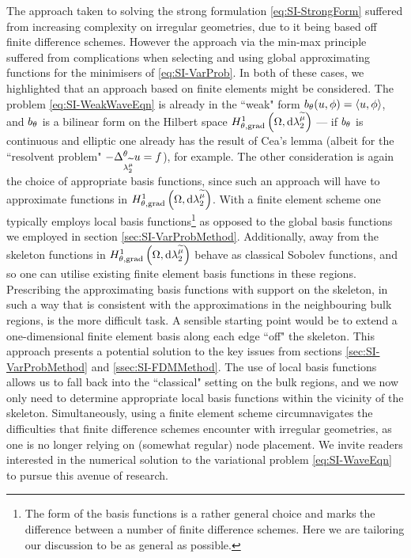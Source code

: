 The approach taken to solving the strong formulation \eqref{eq:SI-StrongForm} suffered from increasing complexity on irregular geometries, due to it being based off finite difference schemes.
However the approach via the min-max principle suffered from complications when selecting and using global approximating functions for the minimisers of \eqref{eq:SI-VarProb}.
In both of these cases, we highlighted that an approach based on finite elements might be considered.
The problem \eqref{eq:SI-WeakWaveEqn} is already in the ``weak" form $b_{\theta}(u,\phi)=\left\langle u , \phi \right\rangle$, and $b_{\theta}$ is a bilinear form on the Hilbert space $H^1_{\theta, \mathrm{grad}}\left( \Omega, \mathrm{d}\lambda_2^{\widetilde{\mu}} \right)$ --- if $b_{\theta}$ is continuous and elliptic one already has the result of Cea's lemma (albeit for the ``resolvent problem" $-\Delta_{\lambda_2^{\widetilde{\mu}}}^\theta u=f$), for example.
The other consideration is again the choice of appropriate basis functions, since such an approach will have to approximate functions in $H^1_{\theta, \mathrm{grad}}\left( \Omega, \mathrm{d}\lambda_2^{\widetilde{\mu}} \right)$.
With a finite element scheme one typically employs local basis functions\footnote{The form of the basis functions is a rather general choice and marks the difference between a number of finite difference schemes. Here we are tailoring our discussion to be as general as possible.} as opposed to the global basis functions we employed in section \ref{sec:SI-VarProbMethod}.
Additionally, away from the skeleton functions in $H^1_{\theta, \mathrm{grad}}\left( \Omega, \mathrm{d}\lambda_2^{\widetilde{\mu}} \right)$ behave as classical Sobolev functions, and so one can utilise existing finite element basis functions in these regions.
Prescribing the approximating basis functions with support on the skeleton, in such a way that is consistent with the approximations in the neighbouring bulk regions, is the more difficult task.
A sensible starting point would be to extend a one-dimensional finite element basis along each edge ``off" the skeleton.
This approach presents a potential solution to the key issues from sections \ref{sec:SI-VarProbMethod} and \ref{ssec:SI-FDMMethod}.
The use of local basis functions allows us to fall back into the ``classical" setting on the bulk regions, and we now only need to determine appropriate local basis functions within the vicinity of the skeleton.
Simultaneously, using a finite element scheme circumnavigates the difficulties that finite difference schemes encounter with irregular geometries, as one is no longer relying on (somewhat regular) node placement.
We invite readers interested in the numerical solution to the variational problem \eqref{eq:SI-WaveEqn} to pursue this avenue of research.

